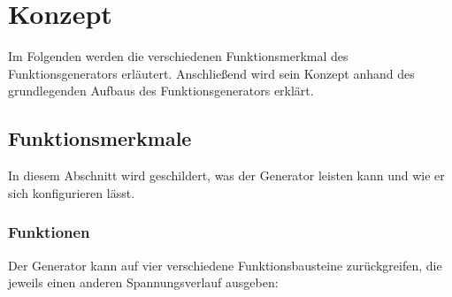 \chapter{Konzept}
Im Folgenden werden die verschiedenen Funktionsmerkmal des Funktionsgenerators erläutert.
Anschließend wird sein Konzept anhand des grundlegenden Aufbaus des Funktionsgenerators erklärt.
 
\section{Funktionsmerkmale} \label{Concept:Feature}
In diesem Abschnitt wird geschildert, was der Generator leisten kann und wie er sich konfigurieren lässt. 

\subsection{Funktionen} \label{Concept:Feature:Func}
Der Generator kann auf vier verschiedene Funktionsbausteine zurückgreifen, die jeweils einen anderen Spannungsverlauf ausgeben:

